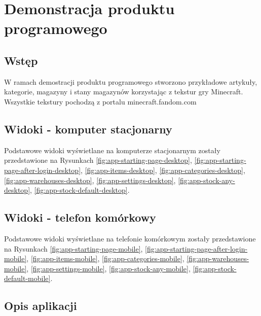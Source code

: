 \documentclass[../main.tex]{subfiles}
\begin{document}
\newcommand\getImageWidth{1\linewidth}
\newcommand\getImageHeight{0.3\pdfpageheight}

\section{Demonstracja produktu programowego}
    \subsection{Wstęp}
        W ramach demostracji produktu programowego stworzono przykładowe artykuły, kategorie, magazyny i stany magazynów korzystając z tekstur gry Minecraft. Wszystkie tekstury pochodzą z portalu minecraft.fandom.com \cite{minecraft-images}
    \subsection{Widoki - komputer stacjonarny}
        Podstawowe widoki wyświetlane na komputerze stacjonarnym zostały przedstawione na Rysunkach 
        \ref{fig:app-starting-page-desktop},
        \ref{fig:app-starting-page-after-login-desktop},
        \ref{fig:app-items-desktop}, 
        \ref{fig:app-categories-desktop}, 
        \ref{fig:app-warehouses-desktop}, 
        \ref{fig:app-settings-desktop},
        \ref{fig:app-stock-any-desktop},
        \ref{fig:app-stock-default-desktop}.

    \subsection{Widoki - telefon komórkowy}
    Podstawowe widoki wyświetlane na telefonie komórkowym zostały przedstawione na Rysunkach 
        \ref{fig:app-starting-page-mobile}, 
        \ref{fig:app-starting-page-after-login-mobile}, 
        \ref{fig:app-items-mobile}, 
        \ref{fig:app-categories-mobile}, 
        \ref{fig:app-warehouses-mobile}, 
        \ref{fig:app-settings-mobile},
        \ref{fig:app-stock-any-mobile},
        \ref{fig:app-stock-default-mobile}.

    \subsection{Opis aplikacji}
\end{document}
